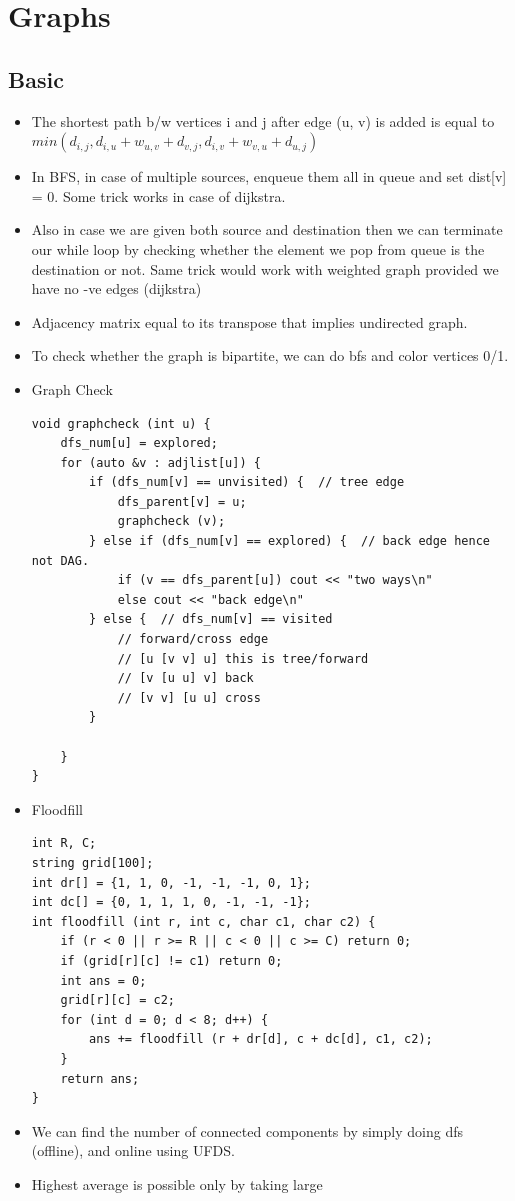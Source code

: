 \documentclass[8pt, a4paper, oneside, twocolumn]{extarticle}
\begin{document}
\section{Graphs}
\subsection{Basic}
\begin{itemize}
    \item The shortest path b/w vertices i and j after edge (u, v) is added is equal to $min(d_{i, j}, d_{i, u} + w_{u, v} + d_{v, j}, d_{i, v} + w_{v, u} + d_{u, j})$
    \item In BFS, in case of multiple sources, enqueue them all in queue and set dist[v] = 0. Some trick works in case of dijkstra.
    \item Also in case we are given both source and destination then we can terminate our while loop by checking whether the element we pop from queue is the destination or not. Same trick would work with weighted graph provided we have no -ve edges (dijkstra)
    \item Adjacency matrix equal to its transpose that implies undirected graph.
    \item To check whether the graph is bipartite, we can do bfs and color vertices 0/1.
    \item Graph Check
    \begin{verbatim}
void graphcheck (int u) {
    dfs_num[u] = explored;
    for (auto &v : adjlist[u]) {
        if (dfs_num[v] == unvisited) {  // tree edge
            dfs_parent[v] = u;
            graphcheck (v);
        } else if (dfs_num[v] == explored) {  // back edge hence not DAG.
            if (v == dfs_parent[u]) cout << "two ways\n"
            else cout << "back edge\n"
        } else {  // dfs_num[v] == visited
            // forward/cross edge
            // [u [v v] u] this is tree/forward
            // [v [u u] v] back
            // [v v] [u u] cross
        }

    }
}
    \end{verbatim}
    \item Floodfill
    \begin{verbatim}
int R, C;
string grid[100];
int dr[] = {1, 1, 0, -1, -1, -1, 0, 1};
int dc[] = {0, 1, 1, 1, 0, -1, -1, -1};
int floodfill (int r, int c, char c1, char c2) {
    if (r < 0 || r >= R || c < 0 || c >= C) return 0;
    if (grid[r][c] != c1) return 0;
    int ans = 0;
    grid[r][c] = c2;
    for (int d = 0; d < 8; d++) {
        ans += floodfill (r + dr[d], c + dc[d], c1, c2);
    }
    return ans;
}
    \end{verbatim}
    \item We can find the number of connected components by simply doing dfs (offline), and online using UFDS.
    \item Highest average is possible only by taking large 
\end{itemize}
\end{document}
